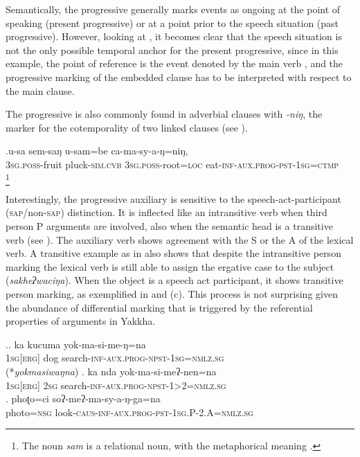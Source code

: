 Semantically, the progressive generally marks events as ongoing at the point of speaking (present progressive) or at a point prior to the speech situation (past progressive). However, looking at \Last[c], it becomes clear that the speech situation is not the only possible temporal anchor for the present progressive, since in this example, the  point of reference is the event denoted by the main verb , and the progressive marking of the embedded clause has to be interpreted with respect to the main clause.


The progressive is also commonly found in adverbial clauses with \emph{-niŋ}, the marker for the cotemporality of two linked clauses (see \Next). 

\exg.u-sa   sem-saŋ        u-sam=be               ca-ma-sy-a-ŋ=niŋ, \\
{\scshape 3sg.poss-}fruit pluck{\scshape -sim.cvb}  {\scshape 3sg.poss-}root{\scshape =loc} eat{\scshape -inf-aux.prog-pst-1sg=ctmp}\\
\footnote{The noun \emph{sam} is a relational noun,  with the metaphorical meaning .} 

Interestingly, the progressive auxiliary is sensitive to the speech-act-participant (\textsc{sap}/non-\textsc{sap}) distinction. It is inflected like an intransitive verb when  third person P arguments are involved, also when the semantic head is a transitive verb (see \Next[a]). The auxiliary verb shows  agreement with the S or the A of the lexical verb. A transitive example as in \LLast[c] also shows that despite the intransitive person marking  the lexical verb is still able to assign the ergative case to the subject (\emph{sakheʔwaciŋa}).  When the object is a speech act participant, it shows transitive person marking, as exemplified in \Next[b] and (c). This process is not surprising given the abundance of differential marking that is triggered by the referential properties of arguments in Yakkha.

\ex.\ag. ka kucuma yok-ma-si-me-ŋ=na\\
	{\scshape 1sg[erg]} dog search-{\scshape inf-aux.prog-npst-1sg=nmlz.sg}\\
	  (*\emph{yokmasiwaŋna})
\bg. ka nda yok-ma-si-meʔ-nen=na\\
{\scshape 1sg[erg]} {\scshape 2sg} search-{\scshape inf-aux.prog-npst-1>2=nmlz.sg}\\
\bg. phoʈo=ci soʔ-meʔ-ma-sy-a-ŋ-ga=na\\
photo{\scshape =nsg} look{\scshape -caus-inf-aux.prog-pst-1sg.P-2.A=nmlz.sg}\\

